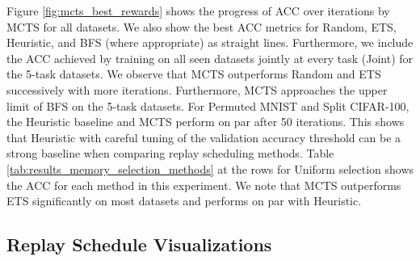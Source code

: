 Figure \ref{fig:mcts_best_rewards} shows the progress of ACC over %
iterations by MCTS for all datasets. We also show the best ACC metrics for Random, ETS, Heuristic, and BFS (where appropriate) as straight lines. 
Furthermore, we include the ACC achieved by training on all seen datasets jointly at every task (Joint) for the 5-task datasets.
We observe that MCTS outperforms Random and ETS successively with more iterations. Furthermore, MCTS approaches the upper limit of BFS on the 5-task datasets. For Permuted MNIST and Split CIFAR-100, the Heuristic baseline and MCTS perform on par after 50 iterations. This shows that Heuristic with careful tuning of the validation accuracy threshold can be a strong baseline when comparing replay scheduling methods. Table \ref{tab:results_memory_selection_methods} at the rows for Uniform selection shows the ACC for each method in this experiment. We note that MCTS outperforms ETS significantly on most datasets and performs on par with Heuristic.


%
\subsection{Replay Schedule Visualizations}
\label{paperC:sec:replay_schedule_visualization}


